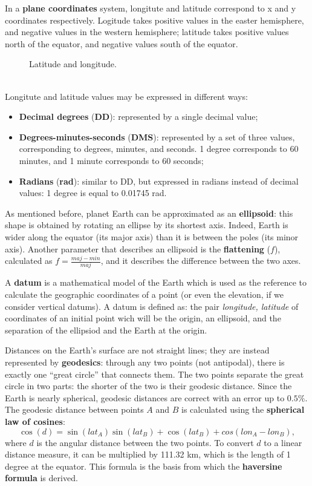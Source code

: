 In a \textbf{plane coordinates} system, longitute and latitude correspond to x and y coordinates respectively. Logitude takes positive values in the easter hemisphere, and negative values in the western hemisphere; latitude takes positive values north of the equator, and negative values south of the equator.
\begin{figure}[!ht]
    \centering
    
    \caption{Latitude and longitude.}
    \label{fig:lat-lon-earth}
\end{figure}
\\
Longitute and latitude values may be expressed in different ways:
\begin{itemize}
    \item \textbf{Decimal degrees} (\textbf{DD}): represented by a single decimal value;
    \item \textbf{Degrees-minutes-seconds} (\textbf{DMS}): represented by a set of three values, corresponding to degrees, minutes, and seconds. 1 degree corresponds to 60 minutes, and 1 minute corresponds to 60 seconds;
    \item \textbf{Radians} (\textbf{rad}): similar to DD, but expressed in radians instead of decimal values: 1 degree is equal to 0.01745 rad.
\end{itemize}

As mentioned before, planet Earth can be approximated as an \textbf{ellipsoid}: this shape is obtained by rotating an ellipse by its shortest axis. Indeed, Earth is wider along the equator (its major axis) than it is between the poles (its minor axis). Another parameter that describes an ellipsoid is the \textbf{flattening} ($f$), calculated as $f = \frac{maj - min}{maj}$, and it describes the difference between the two axes.

A \textbf{datum} is a mathematical model of the Earth which is used as the reference to calculate the geographic coordinates of a point (or even the elevation, if we consider vertical datums). A datum is defined as: the pair \textit{longitude, latitude} of coordinates of an initial point wich will be the origin, an ellipsoid, and the separation of the ellipsiod and the Earth at the origin.

Distances on the Earth's surface are not straight lines; they are instead represented by \textbf{geodesics}: through any two points (not antipodal), there is exactly one ``great circle'' that connects them. The two points separate the great circle in two parts: the shorter of the two is their geodesic distance. Since the Earth is nearly spherical, geodesic distances are correct with an error up to $0.5\%$. The geodesic distance between points $A$ and $B$ is calculated using the \textbf{spherical law of cosines}:
\begin{equation*}
    \cos(d) = \sin(\textit{lat}_A) \sin(\textit{lat}_B) + \cos(\textit{lat}_B) + cos(\textit{lon}_A - \textit{lon}_B),
\end{equation*}
where $d$ is the angular distance between the two points. To convert $d$ to a linear distance measure, it can be multiplied by 111.32 km, which is the length of 1 degree at the equator. This formula is the basis from which the \textbf{haversine formula} is derived.

